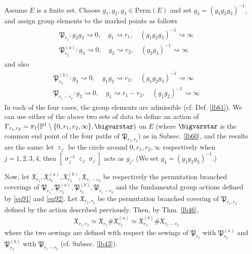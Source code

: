 \documentclass[12pt,a4paper,notitlepage]{article}
\theoremstyle{definition}
\theoremstyle{plain}
\newcommand{\fk}{\mathfrak}
\newcommand{\Pbb}{\mathbb P}
\newcommand{\Perm}{\mathrm{Perm}}
\numberwithin{equation}{subsection}
\begin{document}
Assume $E$ is a finite set.  Choose $g_1,g_2,g_3\in\Perm(E)$ and set $g_4=(g_1g_2g_3)^{-1}$, and assign group elements to the marked points as follows
\begin{gather}\label{eq91}
\begin{array}{c}
\fk P_{r_1}: g_2g_3\rightsquigarrow 0,\quad g_1\rightsquigarrow	r_1,\quad (g_1g_2g_3)^{-1}\rightsquigarrow \infty\\[0.7ex]
\fk P_{r_2}^{(a)}: g_3\rightsquigarrow 0,\quad g_2\rightsquigarrow	r_2,\quad (g_2g_3)^{-1}\rightsquigarrow \infty
\end{array}
\end{gather}
and also
\begin{gather}\label{eq92}
\begin{array}{c}
\fk P_{r_2}^{(b)}: g_3\rightsquigarrow 0,\quad g_1g_2\rightsquigarrow	r_2,\quad (g_1g_2g_3)^{-1}\rightsquigarrow \infty\\[0.7ex]
\fk P_{r_1-r_2}: g_2\rightsquigarrow 0,\quad g_1\rightsquigarrow	r_1-r_2,\quad (g_1g_2)^{-1}\rightsquigarrow \infty
\end{array}
\end{gather}
In each of the four cases, the group elements are admissible (cf. Def. \ref{lb61}). We can use either of the  above two sets of data to define an action of $\Gamma_{r_1,r_2}=\pi_1(\Pbb^1\setminus\{0,r_1,r_2,\infty\},\bigvarstar)$ on $E$ (where $\bigvarstar$ is the common end point of the four paths of $\fk P_{r_1,r_2}$) as in Subsec. \ref{lb60}, and the results are the same: let $\upepsilon_j$ be the circle around $0,r_1,r_2,\infty$ respectively when $j=1,2,3,4$, then $[\upsigma_j^{-1}\upepsilon_j\upsigma_j]$ acts as $g_j$. (We set $g_4=(g_1g_2g_3)^{-1}$.)

Now, let $\fk X_{r_1},\fk X_{r_2}^{(a)},\fk X_{r_2}^{(b)},\fk X_{r_1-r_2}$ be respectively the permutation branched coverings of $\fk P_{r_1},\fk P_{r_2}^{(a)},\fk P_{r_2}^{(b)},\fk P_{r_1-r_2}$ and the fundamental group actions defined by \eqref{eq91} and \eqref{eq92}. Let $\fk X_{r_1,r_2}$ be the permutation branched covering of $\fk P_{r_1,r_2}$ defined by the action described previously. Then, by Thm. \ref{lb46}, 
\begin{align}
\fk X_{r_1,r_2}\simeq \fk X_{r_1}\#\fk X_{r_2}^{(a)}\simeq \fk X_{r_2}^{(b)}\#\fk X_{r_1-r_2}	\label{eq99}
\end{align}
where the two sewings are defined with respect the sewings of $\fk P_{r_1}$ with $\fk P_{r_2}^{(a)}$ and $\fk P_{r_2}^{(b)}$ with $\fk P_{r_1-r_2}$ (cf. Subsec. \ref{lb43}).
\end{document}
